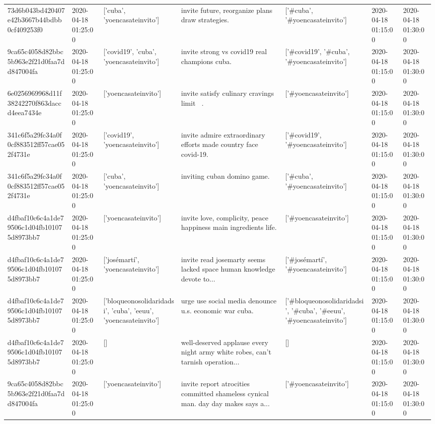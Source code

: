 \begin{tabular}{lllllll}
73d6b043bd420407e42b3667b44bdbb0cf409253f0 & 2020-04-18 01:25:00 & ['cuba', 'yoencasateinvito'] & invite future, reorganize plans draw strategies. & ['#cuba', '#yoencasateinvito'] & 2020-04-18 01:15:00 & 2020-04-18 01:30:00 \\
9ca65c4058d82bbc5b963e2f21d0faa7dd847004fa & 2020-04-18 01:25:00 & ['covid19', 'cuba', 'yoencasateinvito'] & invite strong vs covid19 real champions cuba. & ['#covid19', '#cuba', '#yoencasateinvito'] & 2020-04-18 01:15:00 & 2020-04-18 01:30:00 \\
6e0256969968d11f38242270f863daccd4eea7434e & 2020-04-18 01:25:00 & ['yoencasateinvito'] & invite satisfy culinary cravings limit 🤣🤣. & ['#yoencasateinvito'] & 2020-04-18 01:15:00 & 2020-04-18 01:30:00 \\
341c6f5a29fc34a0f0cf883512ff57cae052f4731e & 2020-04-18 01:25:00 & ['covid19', 'yoencasateinvito'] & invite admire extraordinary efforts made country face covid-19. & ['#covid19', '#yoencasateinvito'] & 2020-04-18 01:15:00 & 2020-04-18 01:30:00 \\
341c6f5a29fc34a0f0cf883512ff57cae052f4731e & 2020-04-18 01:25:00 & ['cuba', 'yoencasateinvito'] & inviting cuban domino game. & ['#cuba', '#yoencasateinvito'] & 2020-04-18 01:15:00 & 2020-04-18 01:30:00 \\
d4fbaf10c6c4a1de79506c1d04fb101075d8973bb7 & 2020-04-18 01:25:00 & ['yoencasateinvito'] & invite love, complicity, peace happiness main ingredients life. & ['#yoencasateinvito'] & 2020-04-18 01:15:00 & 2020-04-18 01:30:00 \\
d4fbaf10c6c4a1de79506c1d04fb101075d8973bb7 & 2020-04-18 01:25:00 & ['josémartí', 'yoencasateinvito'] & invite read josemarty seems lacked space human knowledge devote to... & ['#josémartí', '#yoencasateinvito'] & 2020-04-18 01:15:00 & 2020-04-18 01:30:00 \\
d4fbaf10c6c4a1de79506c1d04fb101075d8973bb7 & 2020-04-18 01:25:00 & ['bloqueonosolidaridadsi', 'cuba', 'eeuu', 'yoencasateinvito'] & urge use social media denounce u.s. economic war cuba. & ['#bloqueonosolidaridadsi', '#cuba', '#eeuu', '#yoencasateinvito'] & 2020-04-18 01:15:00 & 2020-04-18 01:30:00 \\
d4fbaf10c6c4a1de79506c1d04fb101075d8973bb7 & 2020-04-18 01:25:00 & [] & well-deserved applause every night army white robes, can't tarnish operation... & [] & 2020-04-18 01:15:00 & 2020-04-18 01:30:00 \\
9ca65c4058d82bbc5b963e2f21d0faa7dd847004fa & 2020-04-18 01:25:00 & ['yoencasateinvito'] & invite report atrocities committed shameless cynical man. day day makes says a... & ['#yoencasateinvito'] & 2020-04-18 01:15:00 & 2020-04-18 01:30:00 \\

\end{tabular}
